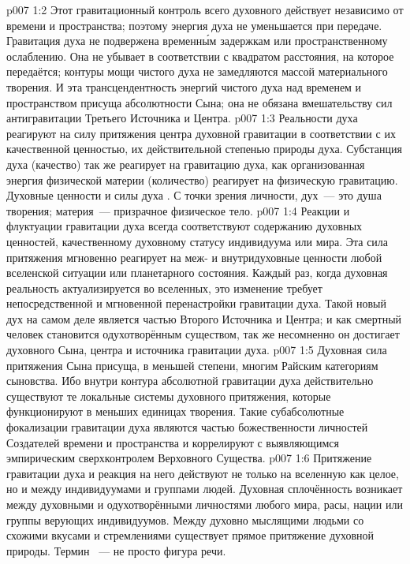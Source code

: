 \vs p007 1:2 Этот гравитационный контроль всего духовного действует независимо от времени и пространства; поэтому энергия духа не уменьшается при передаче. Гравитация духа не подвержена временн\'ым задержкам или пространственному ослаблению. Она не убывает в соответствии с квадратом расстояния, на которое передаётся; контуры мощи чистого духа не замедляются массой материального творения. И эта трансцендентность энергий чистого духа над временем и пространством присуща абсолютности Сына; она не обязана вмешательству сил антигравитации Третьего Источника и Центра.
\vs p007 1:3 Реальности духа реагируют на силу притяжения центра духовной гравитации в соответствии с их качественной ценностью, их действительной степенью природы духа. Субстанция духа (качество) так же реагирует на гравитацию духа, как организованная энергия физической материи (количество) реагирует на физическую гравитацию. Духовные ценности и силы духа . С точки зрения личности, дух~--- это душа творения; материя~--- призрачное физическое тело.
\vs p007 1:4 Реакции и флуктуации гравитации духа всегда соответствуют содержанию духовных ценностей, качественному духовному статусу индивидуума или мира. Эта сила притяжения мгновенно реагирует на меж- и внутридуховные ценности любой вселенской ситуации или планетарного состояния. Каждый раз, когда духовная реальность актуализируется во вселенных, это изменение требует непосредственной и мгновенной перенастройки гравитации духа. Такой новый дух на самом деле является частью Второго Источника и Центра; и как смертный человек становится одухотворённым существом, так же несомненно он достигает духовного Сына, центра и источника гравитации духа.
\vs p007 1:5 \pc Духовная сила притяжения Сына присуща, в меньшей степени, многим Райским категориям сыновства. Ибо внутри контура абсолютной гравитации духа действительно существуют те локальные системы духовного притяжения, которые функционируют в меньших единицах творения. Такие субабсолютные фокализации гравитации духа являются частью божественности личностей Создателей времени и пространства и коррелируют с выявляющимся эмпирическим сверхконтролем Верховного Существа.
\vs p007 1:6 Притяжение гравитации духа и реакция на него действуют не только на вселенную как целое, но и между индивидуумами и группами людей. Духовная сплочённость возникает между духовными и одухотворёнными личностями любого мира, расы, нации или группы верующих индивидуумов. Между духовно мыслящими людьми со схожими вкусами и стремлениями существует прямое притяжение духовной природы. Термин ~--- не просто фигура речи.
